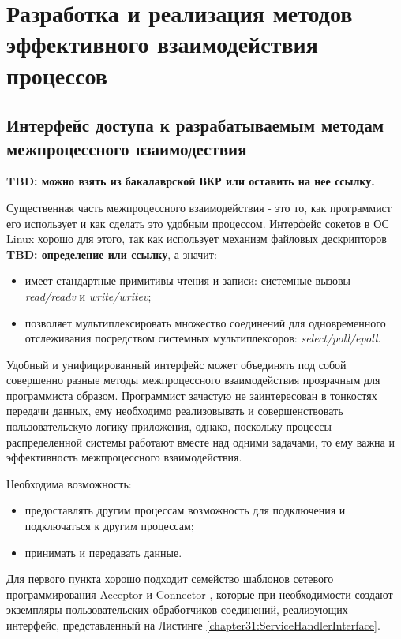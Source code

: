 \chapter{Разработка и реализация методов эффективного взаимодействия процессов}

\section{Интерфейс доступа к разрабатываемым методам межпроцессного взаимодествия}

\textbf{TBD: можно взять из бакалаврской ВКР или оставить на нее ссылку.}

Существенная часть межпроцессного взаимодействия - это то, как программист его использует и как сделать это удобным процессом. Интерфейс сокетов в ОС Linux хорошо для этого, так как использует механизм файловых дескрипторов \textbf{TBD: определение или ссылку}, а значит:
\begin{itemize}
\item имеет стандартные примитивы чтения и записи: системные вызовы \textit{read/readv} и \textit{write/writev};
\item позволяет мультиплексировать множество соединений для одновременного отслеживания посредством системных мультиплексоров: \textit{select/poll/epoll}.
\end{itemize}

Удобный и унифицированный интерфейс может объединять под собой совершенно разные методы межпроцессного взаимодействия прозрачным для программиста образом. Программист зачастую не заинтересован в тонкостях передачи данных, ему необходимо реализовывать и совершенствовать пользовательскую логику приложения, однако, поскольку процессы распределенной системы работают вместе над одними задачами, то ему важна и эффективность межпроцессного взаимодействия.

Необходима возможность:
\begin{itemize}
\item предоставлять другим процессам возможность для подключения и подключаться к другим процессам;
\item принимать и передавать данные.
\end{itemize}

Для первого пункта хорошо подходит семейство шаблонов сетевого программирования Acceptor и Connector \cite{schmidt1996acceptor}, которые при необходимости создают экземпляры пользовательских обработчиков соединений, реализующих интерфейс, представленный на Листинге \ref{chapter31:ServiceHandlerInterface}.

